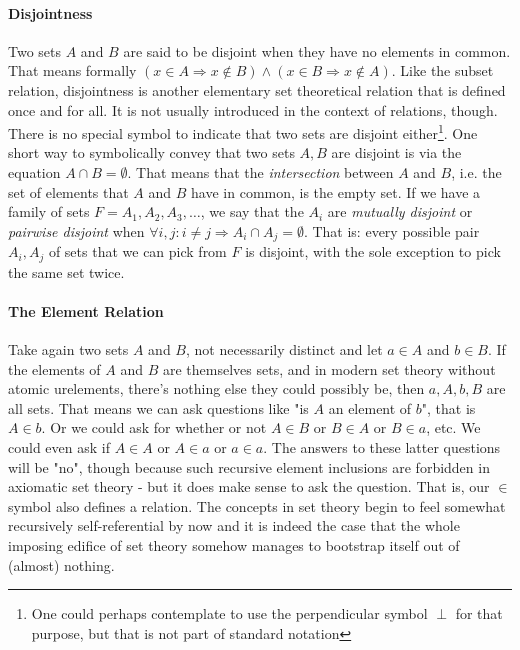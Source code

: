 \paragraph{Disjointness}
Two sets $A$ and $B$ are said to be disjoint when they have no elements in common. That means formally $(x \in A \Rightarrow x \notin B) \wedge (x \in B \Rightarrow x \notin A)$. Like the subset relation, disjointness is another elementary set theoretical relation that is defined once and for all. It is not usually introduced in the context of relations, though. There is no special symbol to indicate that two sets are disjoint either\footnote{One could perhaps contemplate to use the perpendicular symbol $\perp$ for that purpose, but that is not part of standard notation}. One short way to symbolically convey that two sets $A,B$ are disjoint is via the equation $A \cap B = \emptyset$. That means that the \emph{intersection} between $A$ and $B$, i.e. the set of elements that $A$ and $B$ have in common, is the empty set. If we have a family of sets $F = A_1, A_2, A_3, \ldots$, we say that the $A_i$ are \emph{mutually disjoint} or \emph{pairwise disjoint} when $\forall i,j: i \neq j \Rightarrow A_i \cap A_j = \emptyset$. That is: every possible pair $A_i, A_j$ of sets that we can pick from $F$ is disjoint, with the sole exception to pick the same set twice.



\paragraph{The Element Relation} 
Take again two sets $A$ and $B$, not necessarily distinct and let $a \in A$ and $b \in B$. If the elements of $A$ and $B$ are themselves sets, and in modern set theory without atomic urelements, there's nothing else they could possibly be, then $a,A,b,B$ are all sets. That means we can ask questions like "is $A$ an element of $b$", that is $A \in b$. Or we could ask for whether or not $A \in B$ or $B \in A$ or $B \in a$, etc. We could even ask if $A \in A$ or $A \in a$ or $a \in a$. The answers to these latter questions will be "no", though because such recursive element inclusions are forbidden in axiomatic set theory - but it does make sense to ask the question. That is, our $\in$ symbol also defines a relation. The concepts in set theory begin to feel somewhat recursively self-referential by now and it is indeed the case that the whole imposing edifice of set theory somehow manages to bootstrap itself out of (almost) nothing.





